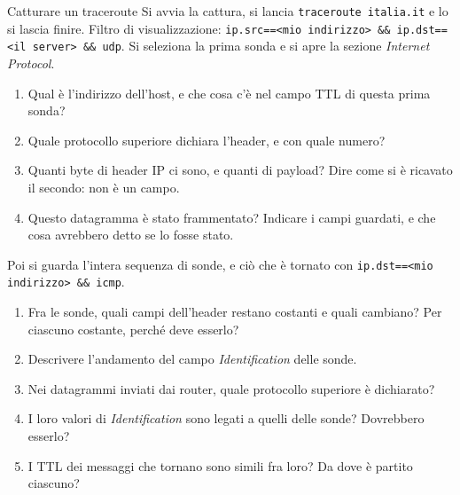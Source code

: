 \begin{esercizio}{Catturare un traceroute}
Si avvia la cattura, si lancia \texttt{traceroute italia.it} e lo si lascia finire. Filtro di visualizzazione:
\texttt{ip.src==<mio indirizzo> \&\& ip.dst==<il server> \&\& udp}. Si seleziona la prima sonda e si apre la sezione
\emph{Internet Protocol}.
\begin{enumerate}[label=(\alph*)]
    \item Qual è l'indirizzo dell'host, e che cosa c'è nel campo TTL di questa prima sonda?
    \item Quale protocollo superiore dichiara l'header, e con quale numero?
    \item Quanti byte di header IP ci sono, e quanti di payload? Dire come si è ricavato il secondo: non è un campo.
    \item Questo datagramma è stato frammentato? Indicare i campi guardati, e che cosa avrebbero detto se lo fosse stato.
\end{enumerate}
Poi si guarda l'intera sequenza di sonde, e ciò che è tornato con \texttt{ip.dst==<mio indirizzo> \&\& icmp}.
\begin{enumerate}[label=(\alph*), resume]
    \item Fra le sonde, quali campi dell'header restano costanti e quali cambiano? Per ciascuno costante, perché deve
          esserlo?
    \item Descrivere l'andamento del campo \emph{Identification} delle sonde.
    \item Nei datagrammi inviati dai router, quale protocollo superiore è dichiarato?
    \item I loro valori di \emph{Identification} sono legati a quelli delle sonde? Dovrebbero esserlo?
    \item I TTL dei messaggi che tornano sono simili fra loro? Da dove è partito ciascuno?
\end{enumerate}


\end{esercizio}
